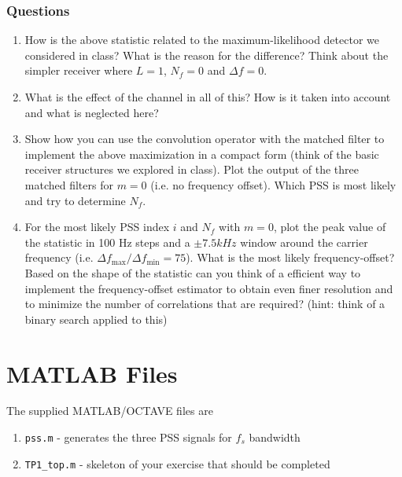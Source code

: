 \documentclass[a4paper,10pt]{article}
\begin{document}
\subsubsection{Questions}
\begin{enumerate}
\item How is the above statistic related to the maximum-likelihood detector we considered in class? What is the reason for the difference? Think about the simpler receiver where $L=1$, $N_f=0$ and $\Delta f=0$. 
\item What is the effect of the channel in all of this?  How is it taken into account and what is neglected here?
\item Show how you can use the convolution operator with the matched filter to implement the above maximization in a compact form (think of the basic receiver structures we explored in class).  Plot the output of the three matched filters for $m=0$ (i.e. no frequency offset). Which PSS is most likely and try to determine $N_f$.
\item For the most likely PSS index $i$ and $N_f$ with $m=0$, plot the peak value of the statistic in 100 Hz steps and a $\pm 7.5 kHz$ window around the carrier frequency (i.e. $\Delta f_\mathrm{max}/\Delta f_\mathrm{min} = 75$).  What is the most likely frequency-offset?  Based on the shape of the statistic can you think of a efficient way to implement the frequency-offset estimator to obtain even finer resolution and to minimize the number of correlations that are required? (hint: think of a binary search applied to this) 

\end{enumerate}
\section{MATLAB Files}
The supplied MATLAB/OCTAVE files are
\begin{enumerate}
\item {\tt pss.m} - generates the three PSS signals for $f_s$ bandwidth 
\item {\tt TP1\_top.m} - skeleton of your exercise that should be completed
\end{enumerate}
\end{document}
